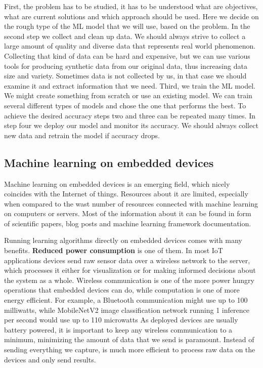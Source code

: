 First, the problem has to be studied, it has to be understood what are objectives, what are current solutions and which approach should be used. 
Here we decide on the rough type of the ML model that we will use, based on the problem.
In the second step we collect and clean up data.
We should always strive to collect a large amount of quality and diverse data that represents real world phenomenon.
Collecting that kind of data can be hard and expensive, but we can use various tools for producing synthetic data from our original data, thus increasing data size and variety.
Sometimes data is not collected by us, in that case we should examine it and extract information that we need.
Third, we train the ML model.
We might create something from scratch or use an existing model. 
We can train several different types of models and chose the one that performs the best.
To achieve the desired accuracy steps two and three can be repeated many times.
In step four we deploy our model and monitor its accuracy. 
We should always collect new data and retrain the model if accuracy drops.


\subsection{ Machine learning on embedded devices} \label{ml_on_embedded}

Machine learning on embedded devices is an emerging field, which nicely coincides with the Internet of things.
Resources about it are limited, especially when compared to the wast number of resources connected with machine learning on computers or servers.
Most of the information about it can be found in form of scientific papers, blog posts and machine learning framework documentation\cite{hello_edge}\cite{tflite_risc-v}\cite{pete_tiny}.

Running learning algorithms directly on embedded devices comes with many benefits.
\textbf{Reduced power consumption} is one of them.
In most IoT applications devices send raw sensor data over a wireless network to the server, which processes it either for visualization or for making informed decisions about the system as a whole. 
Wireless communication is one of the more power hungry operations that embedded devices can do, while computation is one of more energy efficient\cite{pete_tiny}.
For example, a Bluetooth communication might use up to 100 milliwatts, while MobileNetV2 image classification network running 1 inference per second would use up to 110 microwatts\cite{pete_tiny}
As deployed devices are usually battery powered, it is important to keep any wireless communication to a minimum, minimizing the amount of data that we send is paramount.
Instead of sending everything we capture, is much more efficient to process raw data on the devices and only send results.

